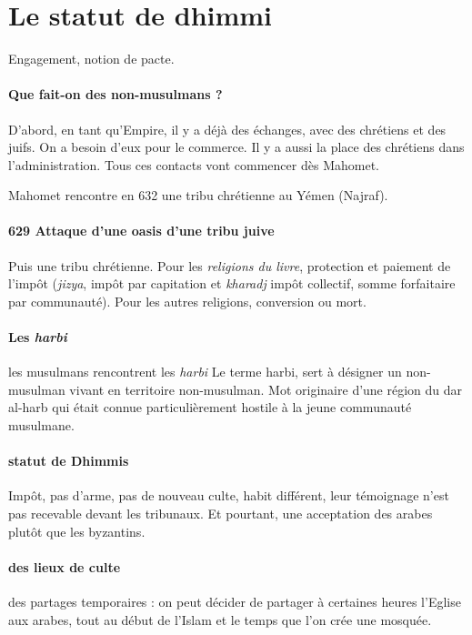 \section{Le statut de dhimmi}

\begin{Def}[dhimmi]
    Engagement, notion de pacte.
\end{Def}

\paragraph{Que fait-on des non-musulmans ?} D'abord, en tant qu'Empire, il y a déjà des échanges, avec des chrétiens et des juifs. On a besoin d'eux pour le commerce. Il y a aussi la place des chrétiens dans l'administration. Tous ces contacts vont commencer dès Mahomet.

 Mahomet  rencontre en 632 une tribu chrétienne au Yémen (Najraf). 

 \paragraph{629 Attaque d'une oasis d'une tribu juive} Puis une tribu chrétienne. Pour les \textit{religions du livre}, protection et paiement de l'impôt (\textit{jizya}, impôt par capitation et \textit{kharadj} impôt collectif, somme forfaitaire par communauté). Pour les autres religions, conversion ou mort.

 \paragraph{Les \textit{harbi}} les musulmans rencontrent les \textit{harbi} Le terme harbi, sert à désigner un non-musulman vivant en territoire non-musulman. Mot originaire d'une région du dar al-harb qui était connue particulièrement hostile à la jeune communauté musulmane.

\paragraph{statut de Dhimmis} Impôt, 
 pas d'arme, pas de nouveau culte, habit différent, leur témoignage n'est pas recevable devant les tribunaux. 
 Et pourtant, une acceptation des arabes plutôt que les byzantins. 

 \paragraph{des lieux de culte} des partages temporaires : on peut décider de partager à certaines heures l'Eglise aux arabes, tout au début de l'Islam et le temps que l'on crée une mosquée.


